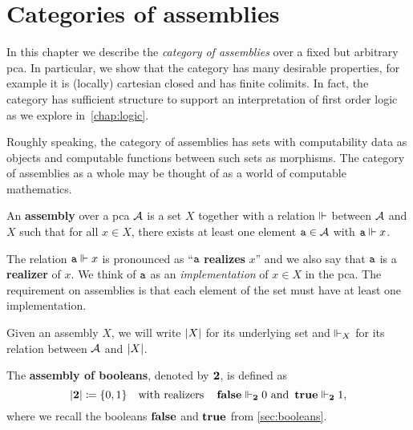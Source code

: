 \chapter{Categories of assemblies}\label{chap:assemblies}

In this chapter we describe the \emph{category of assemblies} over a fixed but
arbitrary pca.
%
In particular, we show that the category has many desirable properties, for
example it is (locally) cartesian closed and has finite colimits.
%
In fact, the category has sufficient structure to support an interpretation of
first order logic as we explore in~\cref{chap:logic}.

Roughly speaking, the category of assemblies has sets with computability
data as objects and computable functions between such sets as morphisms.
%
The category of assemblies as a whole may be thought of as a world of
computable mathematics.

\begin{definition}[Assembly]
  An \textbf{assembly} over a pca \(\AA\) is a set \(X\) together with a
  relation \({\realizes}\) between \(\AA\) and \(X\) such that for all
  \(x \in X\), there exists at least one element \(\pca{a} \in \AA\) with
  \(\pca{a} \realizes x\).
\end{definition}

The relation \(\pca{a} \realizes x\) is pronounced as ``\(\pca{a}\)
\textbf{realizes} \(x\)'' and we also say that \(\pca{a}\) is a
\textbf{realizer} of \(x\). We think of \(\pca{a}\) as an \emph{implementation}
of \(x \in X\) in the pca.
%
The requirement on assemblies is that each element of the set must have at least
one implementation.

\begin{notation}
  Given an assembly \(X\), we will write \(\carrier{X}\) for its underlying set
  and \(\realizes_X\) for its relation between \(\AA\) and \(\carrier{X}\).
\end{notation}

\begin{example}\label{ex:assembly-of-booleans}
  The \textbf{assembly of booleans}, denoted by \(\Two\), is defined as
  \[
    \carrier{\Two} \coloneqq \set{0,1}
    \quad\text{with realizers}\quad
    \pcafalse \realizes_\Two 0
    \text{ and }%
    \pcatrue \realizes_\Two 1,
  \]
  where we recall the booleans \(\pcafalse\) and \(\pcatrue\) from \cref{sec:booleans}.
\end{example}

